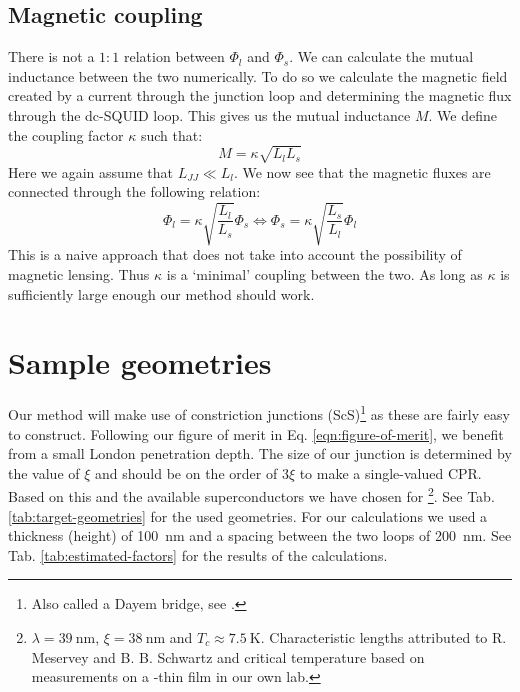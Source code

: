 \subsection{Magnetic coupling}
\label{sec:magnetic-coupling}
There is not a $1:1$ relation between $\Phi_l$ and $\Phi_s$. We can calculate the mutual inductance between the two numerically. To do so we calculate the magnetic field created by a current through the junction loop and determining the magnetic flux through the dc-SQUID loop. This gives us the mutual inductance $M$. We define the coupling factor $\kappa$ such that:
\begin{equation}
	M = \kappa \sqrt{L_lL_s}
\end{equation}
Here we again assume that $L_{JJ} \ll L_l$. We now see that the magnetic fluxes are connected through the following relation:
\begin{equation}
	\Phi_l = \kappa \sqrt{\frac{L_l}{L_s}}\Phi_s \Leftrightarrow \Phi_s = \kappa \sqrt{\frac{L_s}{L_l}}\Phi_l
\end{equation}
This is a naive approach that does not take into account the possibility of magnetic lensing\cite{prigozhin3DSimulationSuperconducting2018}. Thus $\kappa$ is a `minimal' coupling between the two. As long as $\kappa$ is sufficiently large enough our method should work.

\section{Sample geometries}
Our method will make use of constriction junctions (ScS)\footnote{Also called a Dayem bridge, see \citeauthor{likharevSuperconductingWeakLinks1979} \citeyear{likharevSuperconductingWeakLinks1979}.} as these are fairly easy to construct. Following our figure of merit in Eq. \ref{eqn:figure-of-merit}, we benefit from a small London penetration depth. The size of our junction is determined by the value of $\xi$ and should be on the order of $3\xi$\cite{likharevSuperconductingWeakLinks1979} to make a single-valued CPR. Based on this and the available superconductors we have chosen for \footnote{$\lambda = \qty{39}{\nano\meter}$, $\xi = \qty{38}{\nano\meter}$ and $T_c \approx \qty{7.5}{\kelvin}$. Characteristic lengths attributed to R. Meservey and B. B. Schwartz and critical temperature based on measurements on a -thin film in our own lab.}. See Tab. \ref{tab:target-geometries} for the used geometries. For our calculations we used a thickness (height) of \qty{100}{\nano\meter} and a spacing between the two loops of \qty{200}{\nano\meter}. See Tab. \ref{tab:estimated-factors} for the results of the calculations.

